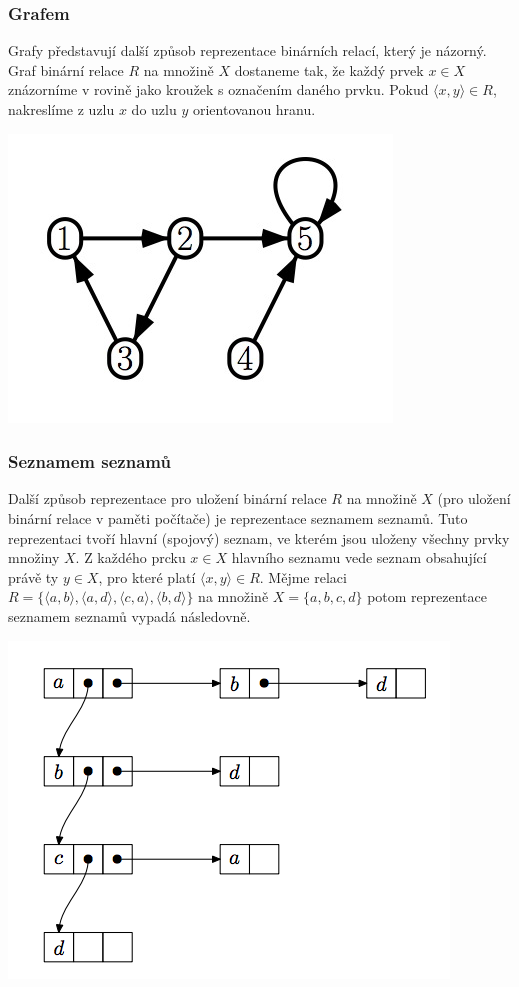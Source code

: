 \documentclass[12pt,a4paper]{article}
\begin{document}
\subsubsection{Grafem}
Grafy představují další způsob reprezentace binárních relací, který je názorný. Graf binární relace $R$ na množině $X$ dostaneme tak, že každý prvek $x \in X$ znázorníme v rovině jako kroužek s označením daného prvku. Pokud $\langle x,y \rangle \in R$, nakreslíme z uzlu $x$ do uzlu $y$ orientovanou hranu.

\begin{center}
	\includegraphics[scale=0.6]{img/RelationGraph}
\end{center}

\subsubsection{Seznamem seznamů}
Další způsob reprezentace pro uložení binární relace $R$ na množině $X$ (pro uložení binární relace v paměti počítače) je reprezentace seznamem seznamů. Tuto reprezentaci tvoří hlavní (spojový) seznam, ve kterém jsou uloženy všechny prvky množiny $X$. Z každého prcku $x \in X$ hlavního seznamu vede seznam obsahující právě ty $y \in X$, pro které platí $\langle x, y \rangle \in R$. Mějme relaci $R = \{\langle a, b\rangle,\langle a, d\rangle,\langle c, a\rangle,\langle b, d\rangle\}$ na množině $X = \{a,b,c,d\}$ potom reprezentace seznamem seznamů vypadá následovně.

\begin{center}
	\includegraphics[scale=0.6]{img/RelationList}
\end{center}
\end{document}
